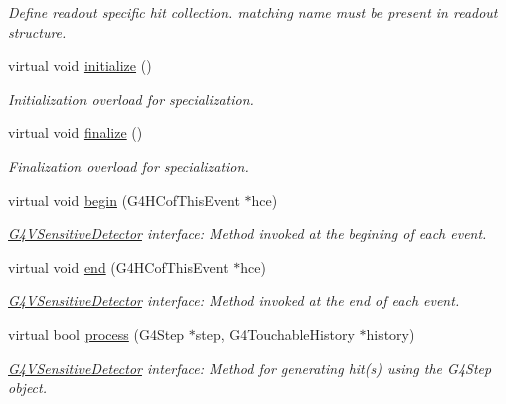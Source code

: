 \begin{DoxyCompactItemize}
\begin{DoxyCompactList}\small\item\em Define readout specific hit collection. matching name must be present in readout structure. \end{DoxyCompactList}\item 
virtual void \hyperlink{class_d_d4hep_1_1_simulation_1_1_geant4_sensitive_action_a6f4a254db9610da9e0a9b8c0a66a20da}{initialize} ()
\begin{DoxyCompactList}\small\item\em Initialization overload for specialization. \end{DoxyCompactList}\item 
virtual void \hyperlink{class_d_d4hep_1_1_simulation_1_1_geant4_sensitive_action_acf98c9d63c8703544da1e68b6c1abeae}{finalize} ()
\begin{DoxyCompactList}\small\item\em Finalization overload for specialization. \end{DoxyCompactList}\item 
virtual void \hyperlink{class_d_d4hep_1_1_simulation_1_1_geant4_sensitive_action_a2e9739b3741bb245e3cc7edb41e7374d}{begin} (G4\+H\+Cof\+This\+Event $\ast$hce)
\begin{DoxyCompactList}\small\item\em \hyperlink{class_g4_v_sensitive_detector}{G4\+V\+Sensitive\+Detector} interface\+: Method invoked at the begining of each event. \end{DoxyCompactList}\item 
virtual void \hyperlink{class_d_d4hep_1_1_simulation_1_1_geant4_sensitive_action_a144120acdde58a966bd627c572ca191d}{end} (G4\+H\+Cof\+This\+Event $\ast$hce)
\begin{DoxyCompactList}\small\item\em \hyperlink{class_g4_v_sensitive_detector}{G4\+V\+Sensitive\+Detector} interface\+: Method invoked at the end of each event. \end{DoxyCompactList}\item 
virtual bool \hyperlink{class_d_d4hep_1_1_simulation_1_1_geant4_sensitive_action_a36759982ed0876a5ce81c14973c18077}{process} (G4\+Step $\ast$step, G4\+Touchable\+History $\ast$history)
\begin{DoxyCompactList}\small\item\em \hyperlink{class_g4_v_sensitive_detector}{G4\+V\+Sensitive\+Detector} interface\+: Method for generating hit(s) using the G4\+Step object. \end{DoxyCompactList}\item 

\end{DoxyCompactItemize}
